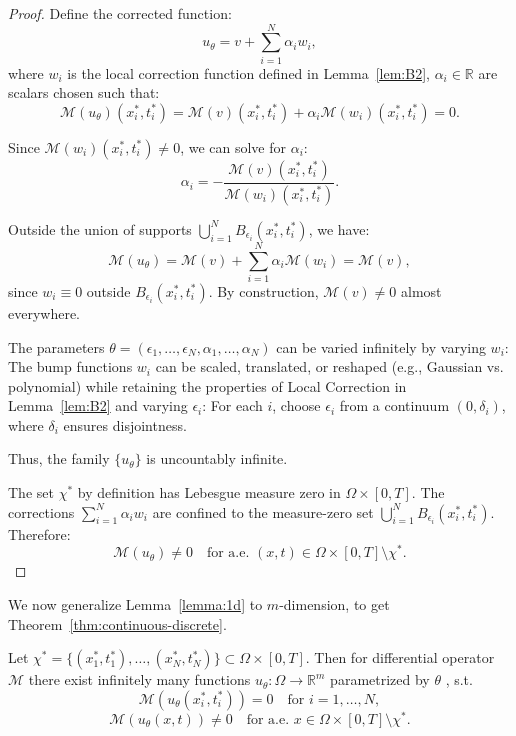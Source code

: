 \begin{proof}
    Define the corrected function:
$$
u_\theta = v + \sum_{i=1}^N \alpha_i w_i,
$$
where $w_i$ is the local correction function defined in Lemma~\ref{lem:B2}, $\alpha_i \in \mathbb{R}$ are scalars chosen such that:
$$
\mathcal{M}(u_\theta)(x_i^*, t_i^*) = \mathcal{M}(v)(x_i^*, t_i^*) + \alpha_i \mathcal{M}(w_i)(x_i^*, t_i^*) = 0.
$$

Since $\mathcal{M}(w_i)(x_i^*, t_i^*) \neq 0$, we can solve for $\alpha_i$:
$$
\alpha_i = -\frac{\mathcal{M}(v)(x_i^*, t_i^*)}{\mathcal{M}(w_i)(x_i^*, t_i^*)}.
$$

Outside the union of supports $\bigcup_{i=1}^N B_{\epsilon_i}(x_i^*, t_i^*)$, we have:
$$
\mathcal{M}(u_\theta) = \mathcal{M}(v) + \sum_{i=1}^N \alpha_i \mathcal{M}(w_i) = \mathcal{M}(v),
$$
since $w_i \equiv 0$ outside $B_{\epsilon_i}(x_i^*, t_i^*)$. By construction, $\mathcal{M}(v) \neq 0$ almost everywhere. 

The parameters $\theta = (\epsilon_1, \dots, \epsilon_N, \alpha_1, \dots, \alpha_N)$ can be varied infinitely by varying $w_i$: The bump functions $w_i$ can be scaled, translated, or reshaped (e.g., Gaussian vs. polynomial) while retaining the properties of Local Correction in Lemma~\ref{lem:B2} and varying $\epsilon_i$: For each $i$, choose $\epsilon_i$ from a continuum $(0, \delta_i)$, where $\delta_i$ ensures disjointness.

Thus, the family $\{u_\theta\}$ is uncountably infinite.

The set $\chi^*$ by definition has Lebesgue measure zero in $\Omega \times [0,T]$. The corrections $\sum_{i=1}^N \alpha_i w_i$ are confined to the measure-zero set $\bigcup_{i=1}^N B_{\epsilon_i}(x_i^*, t_i^*)$. Therefore:
$$
\mathcal{M}(u_\theta) \neq 0 \quad \text{for a.e. } (x,t) \in \Omega \times [0,T] \setminus \chi^*.
$$
\end{proof}


We now generalize Lemma~\ref{lemma:1d} to $m$-dimension, to get Theorem~\ref{thm:continuous-discrete}.

\begin{theorem}
    Let $\chi^* = \{(x^*_1,t^*_1),\dots,(x^*_N,t^*_N)\}\subset \Omega\times[0,T]$. Then for differential operator $\mathcal M$ there exist infinitely many functions
$u_\theta : \Omega \to \mathbb{R}^m$ parametrized by $\theta$ , s.t.
$$ \mathcal{M}(u_\theta(x^*_i,t^*_i)) = 0 \quad \text{for } i=1,\dots,N,$$ $$ 
   \mathcal{M}(u_\theta(x,t)) \neq 0
   \quad \text{for a.e. } x \in \Omega\times[0,T] \setminus \chi^*.$$
\end{theorem}


